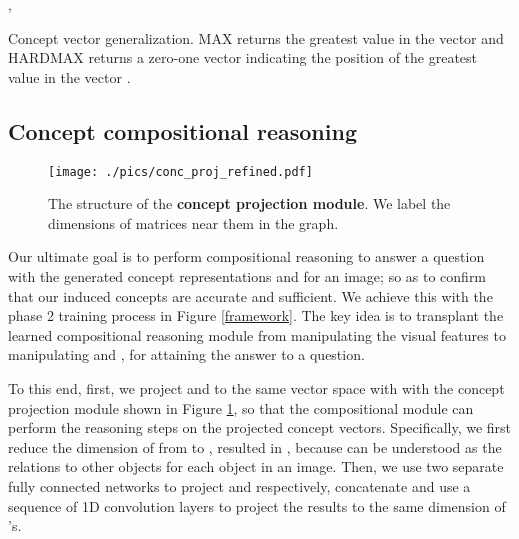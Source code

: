 \documentclass[final]{cvpr}
\begin{document}
\begin{algorithm}[t]
\small
\SetAlgoLined
\KwResult{, }
 , \\
 \caption{\small{Concept vector generalization. MAX returns the greatest value in the vector  and HARDMAX returns a zero-one vector indicating the position of the greatest value in the vector .}}
 \label{conc_gen}
\end{algorithm}

\subsection{Concept compositional reasoning}
\label{ssec:concept_reasoning}
\begin{figure}
\centering
\texttt{[image: ./pics/conc\_proj\_refined.pdf]}
\caption{The structure of the \textbf{concept projection module}. We label the dimensions of matrices near them in the graph.}
\label{conc_proj}
\vspace{-3mm}
\end{figure}

Our ultimate goal is to perform compositional reasoning to answer a question with the generated concept representations  and  for an image; so as to confirm that our induced concepts are accurate and sufficient. We achieve this with the phase 2 training process in Figure \ref{framework}.
The key idea is to transplant the learned compositional reasoning module from manipulating the visual features to manipulating  and , for attaining the answer to a question.



To this end, first, we project  and  to the same vector space with  with the concept projection module shown in Figure \ref{conc_proj}, so that the compositional module can perform the reasoning steps on the projected concept vectors.
Specifically, we first reduce the dimension of  from  to , resulted in , because  can be understood as the relations to other objects for each object in an image. Then, we use two separate fully connected networks to project  and  respectively, concatenate and use a sequence of 1D convolution layers to project the results to the same dimension of 's. 
\end{document}
